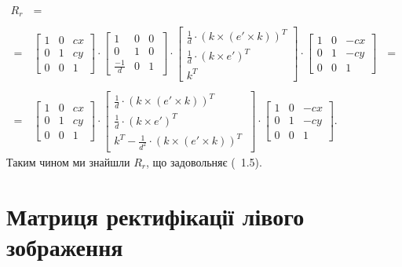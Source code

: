 \begin{equation}
\begin{array}{l}
R_r  \:\:\:  = 
\\\\
= \:\:\:
\left[
\begin{matrix}
1 & 0 & cx\\
0 & 1 & cy\\
0 & 0 & 1\
\end{matrix}
\right]
\cdot
\left[
\begin{matrix}
1 & 0 & 0\\
0 & 1 & 0\\
\frac{-1}{d} & 0 & 1\
\end{matrix}
\right]
\cdot
\left[
\begin{matrix}
\frac{1}{d} \cdot {(k \times (e' \times k))}^T\\
\frac{1}{d} \cdot {(k \times e')}^T\\
k^T\
\end{matrix}
\right]
\cdot
\left[
\begin{matrix}
1 & 0 & -cx\\
0 & 1 & -cy\\
0 & 0 & 1\
\end{matrix}
\right] \:\:\: =
\\\\
= \:\:\:
\left[
\begin{matrix}
1 & 0 & cx\\
0 & 1 & cy\\
0 & 0 & 1\
\end{matrix}
\right]
\cdot
\left[
\begin{matrix}
\frac{1}{d} \cdot {(k \times (e' \times k))}^T\\
\frac{1}{d} \cdot {(k \times e')}^T\\
k^T - \frac{1}{d^2} \cdot {(k \times (e' \times k))}^T\
\end{matrix}
\right]
\cdot
\left[
\begin{matrix}
1 & 0 & -cx\\
0 & 1 & -cy\\
0 & 0 & 1\
\end{matrix}
\right].
\end{array}
\end{equation}
Таким чином ми знайшли $R_r$, що задовольняє (~1.5).



\section{Матриця ректифікації лівого зображення}
